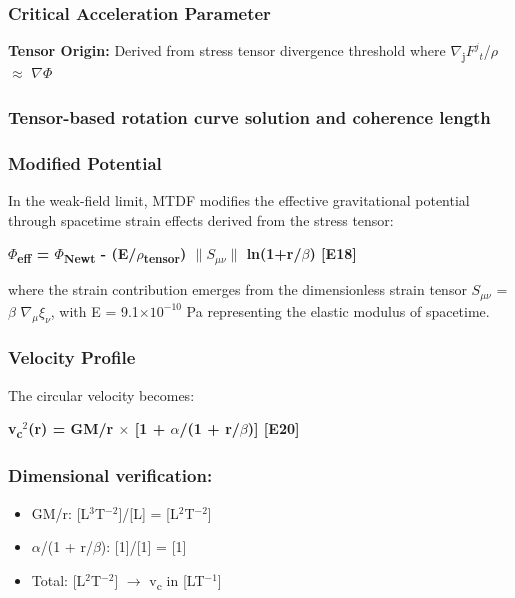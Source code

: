 \documentclass[11pt,a4paper]{article}
\begin{document}
\begin{mdframed}[linecolor=accent,linewidth=0.5pt,backgroundcolor=callout-bg,leftline=true,rightline=true,topline=true,bottomline=true,innerleftmargin=8pt,innerrightmargin=8pt,innertopmargin=6pt,innerbottommargin=6pt]
\subsubsection{Critical Acceleration Parameter}
\textbf{Tensor Origin:} Derived from stress tensor divergence threshold where $\nabla$\textsubscript{j}$F^{j}{}_{t}$/$\rho$ $\approx$ $\nabla$$\Phi$
\end{mdframed}

\subsubsection{Tensor-based rotation curve solution and coherence length}

\subsubsection{Modified Potential}
In the weak-field limit, MTDF modifies the effective gravitational potential through spacetime strain effects derived from the stress tensor:

\textbf{$\Phi$\textsubscript{eff} = $\Phi$\textsubscript{Newt} - (E/\allowbreak{}$\rho$\textsubscript{tensor}) $\|$$S_{\mu\nu}$$\|$ ln(1+r/\allowbreak{}$\beta$) [E18]}

where the strain contribution emerges from the dimensionless strain tensor $S_{\mu\nu}$ = $\beta$ $\nabla_\mu$$\xi_\nu$, with E = 9.1$\times$$10^{-10}$ Pa representing the elastic modulus of spacetime.

\subsubsection{Velocity Profile}
The circular velocity becomes:

\textbf{v\textsubscript{c}$^{2}$(r) = GM/\allowbreak{}r $\times$ [1 + $\alpha$/(1 + r/\allowbreak{}$\beta$)] [E20]}

\begin{mdframed}[linecolor=accent,linewidth=0.5pt,backgroundcolor=callout-bg,leftline=true,rightline=true,topline=true,bottomline=true,innerleftmargin=8pt,innerrightmargin=8pt,innertopmargin=6pt,innerbottommargin=6pt]
\subsubsection{Dimensional verification:}
\begin{itemize}
  \item GM/\allowbreak{}r: [L$^{3}$T$^{-2}$]/[L] = [L$^{2}$T$^{-2}$] \checkmark{}
  \item $\alpha$/(1 + r/\allowbreak{}$\beta$): [1]/[1] = [1] \checkmark{}
  \item Total: [L$^{2}$T$^{-2}$] $\rightarrow$ v\textsubscript{c} in [LT$^{-1}$] \checkmark{}
\end{itemize}
\end{mdframed}
\end{document}
